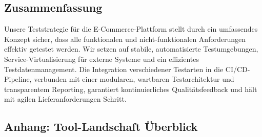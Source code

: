 \subsection{Zusammenfassung}
Unsere Teststrategie für die E-Commerce-Plattform stellt durch ein umfassendes Konzept sicher, dass alle funktionalen und nicht-funktionalen Anforderungen effektiv getestet werden.
Wir setzen auf stabile, automatisierte Testumgebungen, Service-Virtualisierung für externe Systeme und ein effizientes Testdatenmanagement.
Die Integration verschiedener Testarten in die CI/CD-Pipeline, verbunden mit einer modularen, wartbaren Testarchitektur und transparentem Reporting, garantiert kontinuierliches Qualitätsfeedback und hält mit agilen Lieferanforderungen Schritt.
\subsection{Anhang: Tool-Landschaft Überblick}
